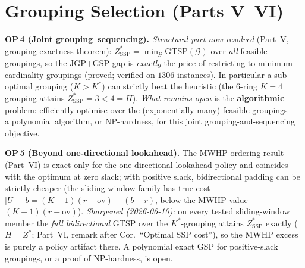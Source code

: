\documentclass[11pt,a4paper]{article}
\newcommand{\ZSSP}{Z_{\mathrm{SSP}}^{*}}
\newcommand{\Kstar}{K^{*}}
\begin{document}
\section{Grouping Selection (Parts V--VI)}
\begin{op}
\textbf{OP\,4 (Joint grouping--sequencing).} \emph{Structural part now resolved} (Part~V,
grouping-exactness theorem): $\ZSSP=\min_{\mathcal{G}}\mathrm{GTSP}(\mathcal{G})$ over
\emph{all} feasible groupings, so the JGP$+$GSP gap is \emph{exactly} the price of
restricting to minimum-cardinality groupings (proved; verified on $1306$ instances). In
particular a sub-optimal grouping ($K>\Kstar$) can strictly beat the heuristic (the
$6$-ring $K=4$ grouping attains $\ZSSP=3<4=H$). \emph{What remains open} is the
\textbf{algorithmic} problem: efficiently optimise over the (exponentially many) feasible
groupings --- a polynomial algorithm, or NP-hardness, for this joint grouping-and-sequencing
objective.
\end{op}
\begin{op}
\textbf{OP\,5 (Beyond one-directional lookahead).} The MWHP ordering result (Part~VI) is
exact only for the one-directional lookahead policy and coincides with the optimum at zero
slack; with positive slack, bidirectional padding can be strictly cheaper (the
sliding-window family has true cost $|U|-b=(K{-}1)(r{-}\mathrm{ov})-(b{-}r)$, below the MWHP
value $(K{-}1)(r{-}\mathrm{ov})$).
\emph{Sharpened (2026-06-10):} on every tested sliding-window member the
\emph{full bidirectional} GTSP over the $\Kstar$-grouping attains $\ZSSP$
exactly ($H=Z^{*}$; Part~VI, remark after Cor.\ ``Optimal SSP cost''), so the
MWHP excess is purely a policy artifact there. A polynomial exact GSP for
positive-slack groupings, or a proof of NP-hardness, is open.
\end{op}
\end{document}
